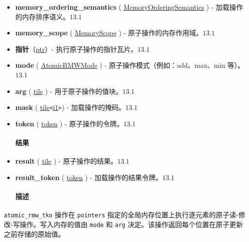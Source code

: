 \documentclass{article}
\begin{document}
\begin{itemize}
\item \textbf{memory\_ordering\_semantics} ( \href{https://docs.nvidia.com/cuda/tile-ir/latest/sections/operations.html#op-attribute-cuda-tile-atomic-rmw-tko-memoryorderingsemantics-attr}{MemoryOrderingSemantics} ) - 加载操作的内存排序语义。$\boxed{13.1}$
\item \textbf{memory\_scope} ( \href{https://docs.nvidia.com/cuda/tile-ir/latest/sections/operations.html#op-attribute-cuda-tile-atomic-rmw-tko-memoryscope-attr}{MemoryScope} ) - 原子操作的内存作用域。$\boxed{13.1}$
\item \textbf{指针}（\href{https://docs.nvidia.com/cuda/tile-ir/latest/sections/types.html#type-ptr}{ptr}）- 执行原子操作的指针瓦片。$\boxed{13.1}$
\item \textbf{mode} ( \href{https://docs.nvidia.com/cuda/tile-ir/latest/sections/operations.html#op-attribute-cuda-tile-atomic-rmw-tko-atomicrmwmode-attr}{AtomicRMWMode} ) - 原子操作模式（例如：add、max、min 等）。$\boxed{13.1}$
\item \textbf{arg} ( \href{https://docs.nvidia.com/cuda/tile-ir/latest/sections/types.html#type-tile}{tile} ) - 用于原子操作的值块。$\boxed{13.1}$
\item \textbf{mask} ( \href{https://docs.nvidia.com/cuda/tile-ir/latest/sections/types.html#type-tile}{tile}\texttt{<}\href{https://docs.nvidia.com/cuda/tile-ir/latest/sections/types.html#subsection-element-types}{i1}\texttt{>}) - 加载操作的掩码。$\boxed{13.1}$
\item \textbf{token} ( \href{https://docs.nvidia.com/cuda/tile-ir/latest/sections/operations.html#type-token}{token} ) - 原子操作的令牌。$\boxed{13.1}$




\paragraph{结果}


\item \textbf{result} ( \href{https://docs.nvidia.com/cuda/tile-ir/latest/sections/types.html#type-tile}{tile} ) - 原子操作的结果。$\boxed{13.1}$
\item \textbf{result\_token} ( \href{https://docs.nvidia.com/cuda/tile-ir/latest/sections/operations.html#type-token}{token} ) - 加载操作的结果令牌。$\boxed{13.1}$




\paragraph{描述}


\end{itemize}
\texttt{atomic\_rmw\_tko} 操作在 \texttt{pointers} 指定的全局内存位置上执行逐元素的原子读-修改-写操作。写入内存的值由 \texttt{mode} 和 \texttt{arg} 决定。该操作返回每个位置在原子更新之前存储的原始值。
\end{document}
